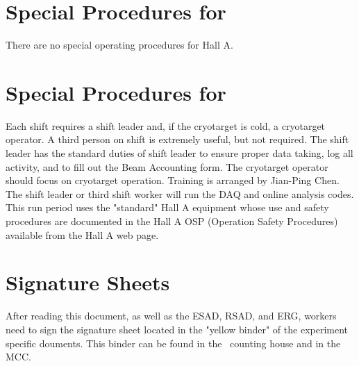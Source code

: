 %
\newpage
\section{Special Procedures for \HALL}

There are no special operating procedures for Hall A.

%
\newpage
\section{Special Procedures for \EXPTS}

Each shift requires a shift leader and, if the cryotarget is cold, a cryotarget 
operator.  A third person on shift is extremely useful, but not required. The shift leader 
has the standard
duties of shift leader to ensure proper data taking, log all activity, and to fill out
the Beam Accounting form. The cryotarget operator should focus on cryotarget
operation. Training is arranged by Jian-Ping Chen. The shift leader or third
shift worker will run the DAQ and online analysis codes.
This run period uses the "standard" Hall A equipment whose
use and safety procedures are documented in the Hall A OSP (Operation Safety
Procedures) available from the Hall A web page.


\newpage
\section{Signature Sheets}

After reading this document, as well as the ESAD, RSAD, and ERG, workers need to sign
the signature sheet located in the "yellow binder" of the experiment specific douments.
This binder can be found in the \HALL\ counting house and in the MCC.

